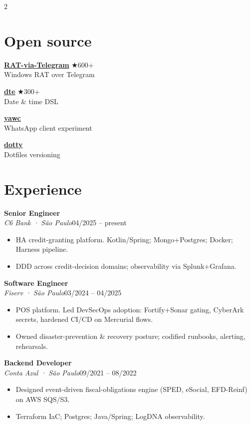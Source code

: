 \documentclass[10pt,a4paper]{article}
\newcommand{\role}[3]{\textbf{#1}\\\textit{\color{muted}#2}\hfill\footnotesize\color{muted}#3\par}
\begin{document}
\begin{paracol}{2}
\section{Open source}
\footnotesize
\textbf{\href{https://github.com/mvrozanti/RAT-via-Telegram}{RAT-via-Telegram}} \hfill ★600+\\
Windows RAT over Telegram\par
\smallskip
\textbf{\href{https://github.com/mvrozanti/dte}{dte}} \hfill ★300+\\Date \& time DSL\par
\smallskip
\textbf{\href{https://github.com/mvrozanti/yawc}{yawc}}\\WhatsApp client experiment\par
\smallskip
\textbf{\href{https://github.com/mvrozanti/dotty}{dotty}}\\Dotfiles versioning

\switchcolumn

\section{Experience}
\footnotesize

\role{Senior Engineer}{C6 Bank · São Paulo}{04/2025 -- present}
\begin{itemize}
\item HA credit-granting platform. Kotlin/Spring; Mongo+Postgres; Docker; Harness pipeline.
\item DDD across credit-decision domains; observability via Splunk+Grafana.
\end{itemize}
\medskip

\role{Software Engineer}{Fiserv · São Paulo}{03/2024 -- 04/2025}
\begin{itemize}
\item POS platform. Led DevSecOps adoption: Fortify+Sonar gating, CyberArk secrets, hardened CI/CD on Mercurial flows.
\item Owned disaster-prevention \& recovery posture; codified runbooks, alerting, rehearsals.
\end{itemize}
\medskip

\role{Backend Developer}{Conta Azul · São Paulo}{09/2021 -- 08/2022}
\begin{itemize}
\item Designed event-driven fiscal-obligations engine (SPED, eSocial, EFD-Reinf) on AWS SQS/S3.
\item Terraform IaC; Postgres; Java/Spring; LogDNA observability.
\end{itemize}
\medskip


\end{paracol}
\end{document}
